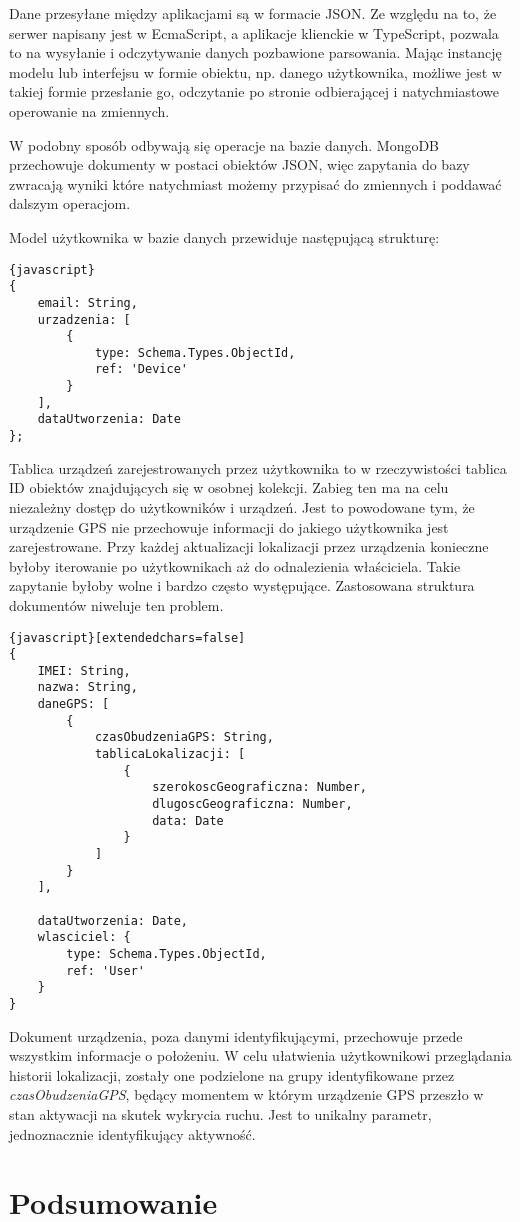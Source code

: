 \documentclass[eng,printmode]{mgr}
\begin{document}
Dane przesyłane między aplikacjami są w formacie JSON. Ze względu na to, że serwer napisany jest w EcmaScript, a aplikacje klienckie w TypeScript, pozwala to na wysyłanie i odczytywanie danych pozbawione parsowania. Mając instancję modelu lub interfejsu w formie obiektu, np. danego użytkownika, możliwe jest w takiej formie przesłanie go, odczytanie po stronie odbierającej i natychmiastowe operowanie na zmiennych.

W podobny sposób odbywają się operacje na bazie danych. MongoDB przechowuje dokumenty w postaci obiektów JSON, więc zapytania do bazy zwracają wyniki które natychmiast możemy przypisać do zmiennych i poddawać dalszym operacjom.

Model użytkownika w bazie danych przewiduje następującą strukturę:
\begin{lstlisting}{javascript}
{
    email: String,
    urzadzenia: [
        {
            type: Schema.Types.ObjectId,
            ref: 'Device'
        }
    ],
    dataUtworzenia: Date
};
\end{lstlisting}
Tablica urządzeń zarejestrowanych przez użytkownika to w rzeczywistości tablica ID obiektów znajdujących się w osobnej kolekcji. Zabieg ten ma na celu niezależny dostęp do użytkowników i urządzeń. Jest to powodowane tym, że urządzenie GPS nie przechowuje informacji do jakiego użytkownika jest zarejestrowane. Przy każdej aktualizacji lokalizacji przez urządzenia konieczne byłoby iterowanie po użytkownikach aż do odnalezienia właściciela. Takie zapytanie byłoby wolne i bardzo często występujące. Zastosowana struktura dokumentów niweluje ten problem.

\begin{lstlisting}{javascript}[extendedchars=false]
{
    IMEI: String,
    nazwa: String,
    daneGPS: [
        {
            czasObudzeniaGPS: String,
            tablicaLokalizacji: [
                {
                    szerokoscGeograficzna: Number,
                    dlugoscGeograficzna: Number,                    
                    data: Date
                }
            ]
        }
    ],

    dataUtworzenia: Date,
    wlasciciel: {
        type: Schema.Types.ObjectId,
        ref: 'User'
    }
}
\end{lstlisting}
Dokument urządzenia, poza danymi identyfikującymi, przechowuje przede wszystkim informacje o położeniu. W celu ułatwienia użytkownikowi przeglądania historii lokalizacji, zostały one podzielone na grupy identyfikowane przez \textit{czasObudzeniaGPS}, będący momentem w którym urządzenie GPS przeszło w stan aktywacji na skutek wykrycia ruchu. Jest to unikalny parametr, jednoznacznie identyfikujący aktywność.





\chapter{Podsumowanie}

 
\end{document}
